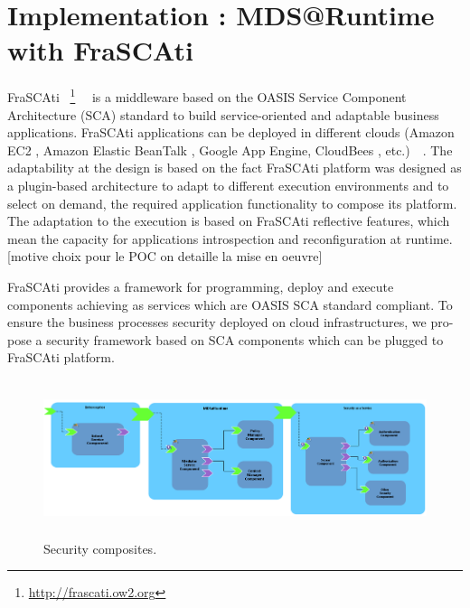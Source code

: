 \documentclass[runningheads,a4paper]{llncs}
\begin{document}
\section{Implementation : MDS@Runtime with FraSCAti}


FraSCAti ~\footnote{\url{http://frascati.ow2.org}}~\cite{SMF09}~\cite{SMR12} is a middleware based on the OASIS Service Component Architecture (SCA) standard to build service-oriented and adaptable business applications. FraSCAti applications can be deployed in different clouds (Amazon EC2 , Amazon Elastic BeanTalk , Google App Engine, CloudBees , etc.)~\cite{MRS11}~\cite{PHM12}. The adaptability at the design is based on the fact FraSCAti platform was designed as a plugin-based architecture to adapt to different execution environments and to select on demand, the required application functionality to compose its platform. The adaptation to the execution is based on FraSCAti reflective features, which mean the capacity for applications introspection and reconfiguration at runtime. [motive choix pour le POC on detaille la mise en oeuvre]

FraSCAti provides a framework for programming, deploy and execute components achieving as services which are OASIS SCA standard compliant. To ensure the business processes security deployed on cloud infrastructures, we pro- pose a security framework based on SCA components which can be plugged to FraSCAti platform. 

\begin{figure}[ht]  
\centering
\includegraphics[height=130pt, width=350pt]{composites.png}
\caption{Security composites.}
\label{fig:compoites}
\end{figure}
\end{document}
